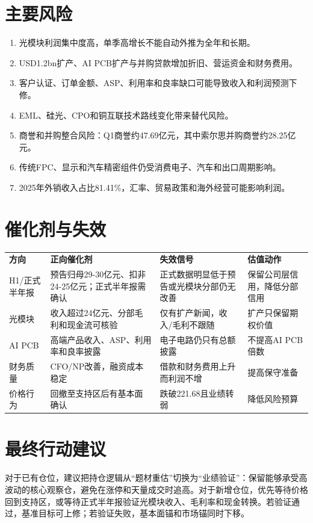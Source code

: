 
\section{主要风险}
\begin{riskbox}[七项核心风险]
\begin{enumerate}
\item 光模块利润集中度高，单季高增长不能自动外推为全年和长期。
\item USD1.2bn扩产、AI PCB扩产与并购贷款增加折旧、营运资金和财务费用。
\item 客户认证、订单金额、ASP、利用率和良率缺口可能导致收入和利润预测下修。
\item EML、硅光、CPO和铜互联技术路线变化带来替代风险。
\item 商誉和并购整合风险：Q1商誉约47.69亿元，其中索尔思并购商誉约28.25亿元。
\item 传统FPC、显示和汽车精密组件仍受消费电子、汽车和出口周期影响。
\item 2025年外销收入占比81.41\%，汇率、贸易政策和海外经营可能影响利润。
\end{enumerate}
\end{riskbox}

\section{催化剂与失效}
\begin{exhibitbox}
\begin{tabularx}{\exhibitboxwidth}{L{3.0cm}X L{3.2cm}X}
\textbf{方向} & \textbf{正向催化剂} & \textbf{失效信号} & \textbf{估值动作} \\
H1/正式半年报 & 预告归母29-30亿元、扣非24-25亿元；正式半年报需确认 & 正式数据明显低于预告或光模块分部仍无改善 & 保留公司层信用，降低分部信用 \\
光模块 & 收入超过24亿元、分部毛利和现金流可核验 & 仅有扩产新闻，收入/毛利不跟随 & 扩产只保留期权价值 \\
AI PCB & 高端产品收入、ASP、利用率和良率披露 & 电子电路仍只有总额披露 & 不提高AI PCB倍数 \\
财务质量 & CFO/NP改善，融资成本稳定 & 借款和财务费用上升而利润不增 & 提高保守准备 \\
价格行为 & 回撤至支持区后有基本面确认 & 跌破221.68且业绩转弱 & 降低风险预算 \\
\end{tabularx}
\end{exhibitbox}

\section{最终行动建议}
对于已有仓位，建议把持仓逻辑从“题材重估”切换为“业绩验证”：保留能够承受高波动的核心观察仓，避免在涨停和天量成交时追高。对于新增仓位，优先等待价格回到支持区，或等待正式半年报验证光模块收入、毛利率和现金转换。若验证通过，基准目标可上修；若验证失败，基本面锚和市场锚同时下移。
